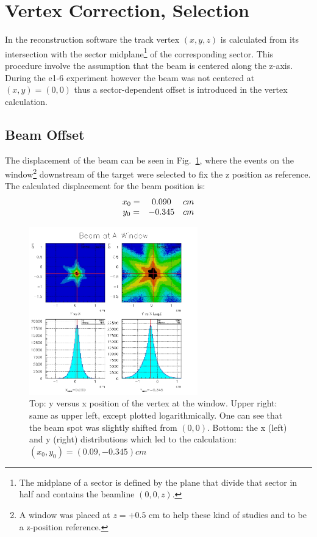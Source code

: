 \section{Vertex Correction, Selection}

In the reconstruction software the track vertex $(x,y,z)$ is calculated
from its intersection with the sector midplane\footnote{The midplane of
a sector is defined by the plane that divide that sector in half and contains
the beamline $(0,0,z)$.} of the corresponding sector. This procedure involve
the assumption that the beam is centered along the z-axis. During the e1-6 
experiment however the beam was not centered at $(x,y) = (0,0)$ thus 
a sector-dependent offset  is introduced in the vertex calculation. 


\subsection{Beam Offset}
The displacement of the beam can be seen in Fig.~\ref{fig:vertex_id}, where the events
on the window\footnote{A window was placed at $z=+0.5$ cm to help these kind of 
studies and to be a z-position reference.} downstream of the target were 
selected to fix the z position as reference. The calculated displacement
\cite{bib:valeri_vertex} for the beam position is:
$$
\begin{array}{c c c}
 x_0 = & 0.090   & cm \\
 y_0 = & -0.345 & cm
\end{array}
$$

\begin{figure}[ht]
	\centering
		\includegraphics[width=0.65\textwidth ]{img/beam_displacement.jpg}
			\caption{Top: y versus x position of the vertex at the window.
						Upper right: same as upper left, except plotted logarithmically.
	               One can see that the beam spot was slightly shifted from $(0,0)$.
						Bottom: the x (left) and y (right) distributions which led to
						the calculation: $(x_0, y_0) = (0.09, -0.345)cm$ }
			\label{fig:vertex_id}
\end{figure}

